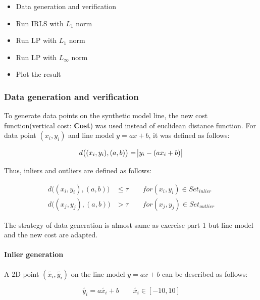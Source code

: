\documentclass[paper=a4, fontsize=11pt]{scrartcl} %
\numberwithin{equation}{section} %
\numberwithin{figure}{section} %
\numberwithin{table}{section} %
\newcommand{\funcname}[1]{\textbf{#1}}
\begin{document}
\begin{itemize}
\item Data generation and verification
\item Run IRLS with $L_{1}$ norm
\item Run LP with $L_{1}$ norm 
\item Run LP with $L_{\infty}$ norm 
\item Plot the result
\end{itemize}  

\subsubsection{Data generation and verification}

To generate data points on the synthetic model line, the new cost function(vertical cost: \funcname{Cost}) was used instead of euclidean distance function. For data point $(x_{i}, y_{i})$ and line model $y = ax + b$, it was defined as follows:

\begin{equation*}
d\big((x_{i}, y_{i}), (a, b)\big) = \abs{y_{i} - (ax_{i} + b)}
\end{equation*}

Thus, inliers and outliers are defined as  follows:

\begin{align*}
d \big( (x_{i}, y_{i}), (a, b) \big) &\leq \tau  \qquad for (x_{i}, y_{i}) \in Set_{inlier} \\
d \big( (x_{j}, y_{j}), (a, b) \big) &> \tau \qquad for (x_{j}, y_{j}) \in Set_{outlier} 
\end{align*}

The strategy of data generation is almost same as exercise part 1 but line model and the new cost are adapted.

\paragraph{Inlier generation}

A 2D point $(\tilde{x_{i}}, \tilde{y_{i}})$ on the line model $y = ax + b$ can be described as follows:

\begin{equation*}
\tilde{y_{i}} = a\tilde{x_{i}} + b \qquad \tilde{x_{i}} \in [-10, 10]
\end{equation*}
\end{document}
